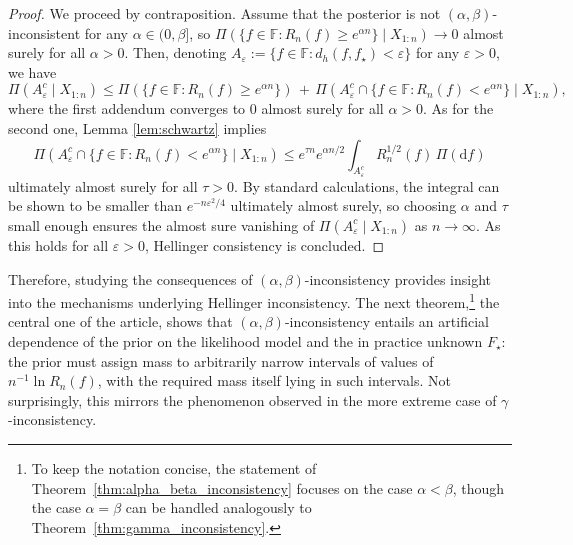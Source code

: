 \documentclass[11pt,twoside]{article}
\def\FF{\mathbb{F}}
\def\FF{\mathbb{F}}
\begin{document}
\begin{proof}
    We proceed by contraposition. Assume that the posterior is not $(\alpha,\beta)$-inconsistent for any $\alpha\in(0,\beta]$, so $\Pi(\{f\in \FF : R_n(f) \geq  e^{\alpha n}\}\mid X_{1:n})\to 0$ almost surely for all $\alpha>0$. Then, denoting $A_\varepsilon:= \{f\in\FF : d_h(f, f_\star)<\varepsilon\}$ for any $\varepsilon>0$, we have
    \begin{equation*}
        \Pi(A_\varepsilon^c\mid X_{1:n}) \leq \Pi(\{f\in\FF : R_n(f) \geq e^{\alpha n}\}) \,+\, \Pi(A_\varepsilon^c \cap \{f\in\FF : R_n(f) < e^{\alpha n}\}\mid X_{1:n}),
    \end{equation*}
    where the first addendum converges to 0 almost surely for all $\alpha>0$. As for the second one, Lemma \ref{lem:schwartz} implies
    \begin{equation*}
        \Pi(A_\varepsilon^c \cap \{f\in\FF : R_n(f) < e^{\alpha n}\}\mid X_{1:n}) \leq e^{\tau n} e^{\alpha n/2} \int_{A_\varepsilon^c} R_n^{1/2}(f) \,\Pi(\mathrm df)
    \end{equation*}
    ultimately almost surely for all $\tau>0$. By standard calculations, the integral can be shown to be smaller than $e^{-n\varepsilon^2/4}$ ultimately almost surely, so choosing $\alpha$ and $\tau$ small enough ensures the almost sure vanishing of $\Pi(A_\varepsilon^c\mid X_{1:n})$ as $n\to\infty$. As this holds for all $\varepsilon>0$, Hellinger consistency is concluded.
\end{proof}


Therefore, studying the consequences of $(\alpha,\beta)$-inconsistency provides insight into the mechanisms underlying Hellinger inconsistency. The next theorem,\footnote{To keep the notation concise, the statement of Theorem~\ref{thm:alpha_beta_inconsistency} focuses on the case $\alpha < \beta$, though the case $\alpha = \beta$ can be handled analogously to Theorem~\ref{thm:gamma_inconsistency}.} the central one of the article, shows that $(\alpha,\beta)$-inconsistency entails an artificial dependence of the prior on the likelihood model and the in practice unknown $F_\star$: the prior must assign mass to arbitrarily narrow intervals of values of $n^{-1}\ln R_n(f)$, with the required mass itself lying in such intervals. Not surprisingly, this mirrors the phenomenon observed in the more extreme case of $\gamma$-inconsistency.
\end{document}
